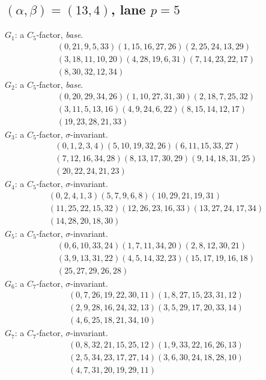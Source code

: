 \documentclass[11pt]{amsart}
\begin{document}
\subsection*{$(\alpha,\beta)=(13,4)$, lane $p=5$}
\smallskip\noindent $G_{1}$: a $C_5$-factor, \emph{base}.
\begin{gather*}
  (0,21,9,5,33)(1,15,16,27,26)(2,25,24,13,29) \\
  (3,18,11,10,20)(4,28,19,6,31)(7,14,23,22,17) \\
  (8,30,32,12,34)
\end{gather*}
\smallskip\noindent $G_{2}$: a $C_5$-factor, \emph{base}.
\begin{gather*}
  (0,20,29,34,26)(1,10,27,31,30)(2,18,7,25,32) \\
  (3,11,5,13,16)(4,9,24,6,22)(8,15,14,12,17) \\
  (19,23,28,21,33)
\end{gather*}
\smallskip\noindent $G_{3}$: a $C_5$-factor, $\sigma$-invariant.
\begin{gather*}
  (0,1,2,3,4)(5,10,19,32,26)(6,11,15,33,27) \\
  (7,12,16,34,28)(8,13,17,30,29)(9,14,18,31,25) \\
  (20,22,24,21,23)
\end{gather*}
\smallskip\noindent $G_{4}$: a $C_5$-factor, $\sigma$-invariant.
\begin{gather*}
  (0,2,4,1,3)(5,7,9,6,8)(10,29,21,19,31) \\
  (11,25,22,15,32)(12,26,23,16,33)(13,27,24,17,34) \\
  (14,28,20,18,30)
\end{gather*}
\smallskip\noindent $G_{5}$: a $C_5$-factor, $\sigma$-invariant.
\begin{gather*}
  (0,6,10,33,24)(1,7,11,34,20)(2,8,12,30,21) \\
  (3,9,13,31,22)(4,5,14,32,23)(15,17,19,16,18) \\
  (25,27,29,26,28)
\end{gather*}
\smallskip\noindent $G_{6}$: a $C_7$-factor, $\sigma$-invariant.
\begin{gather*}
  (0,7,26,19,22,30,11)(1,8,27,15,23,31,12) \\
  (2,9,28,16,24,32,13)(3,5,29,17,20,33,14) \\
  (4,6,25,18,21,34,10)
\end{gather*}
\smallskip\noindent $G_{7}$: a $C_7$-factor, $\sigma$-invariant.
\begin{gather*}
  (0,8,32,21,15,25,12)(1,9,33,22,16,26,13) \\
  (2,5,34,23,17,27,14)(3,6,30,24,18,28,10) \\
  (4,7,31,20,19,29,11)
\end{gather*}
\end{document}

